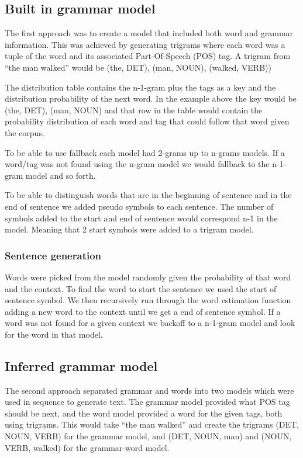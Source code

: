 \documentclass[a4paper,12pt]{article}
\begin{document}
\subsection{Built in grammar model}
The first approach was to create a model that included both word and grammar information. This was achieved by generating trigrams where each word was a tuple of the word and its associated Part-Of-Speech (POS) tag. A trigram from ``the man walked'' would be (the, DET), (man, NOUN), (walked, VERB)) 

The distribution table contains the n-1-gram plus the tags as a key and the distribution probability of the next word. In the example above the key would be (the, DET), (man, NOUN) and that row in the table would contain the probability distribution of each word and tag that could follow that word given the corpus.

To be able to use fallback each model had 2-grams up to n-grams models. If a word/tag was not found using the n-gram model we would fallback to the n-1-gram model and so forth.

To be able to distinguish words that are in the beginning of sentence and in the end of sentence we added pseudo symbols to each sentence. The number of symbols added to the start and end of sentence would correspond n-1 in the model. Meaning that 2 start symbols were added to a trigram model.

\subsubsection{Sentence generation}
Words were picked from the model randomly given the probability of that word and the context. To find the word to start the sentence we used the start of sentence symbol. We then recursively run through the word estimation function adding a new word to the context until we get a end of sentence symbol. If a word was not found for a given context we backoff to a n-1-gram model and look for the word in that model. 

\subsection{Inferred grammar model}
The second approach separated grammar and words into two models which were used in sequence to generate text. The grammar model provided what POS tag should be next, and the word model provided a word for the given tags, both using trigrams. This would take ``the man walked'' and create the trigrams (DET, NOUN, VERB) for the grammar model, and (DET, NOUN, man) and (NOUN, VERB, walked) for the grammar-word model.
\end{document}
